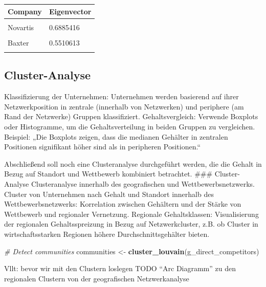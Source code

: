 \documentclass[
]{article}
\newenvironment{Shaded}{\begin{snugshade}}{\end{snugshade}}
\newcommand{\CommentTok}[1]{\textcolor[rgb]{0.56,0.35,0.01}{\textit{#1}}}
\newcommand{\FunctionTok}[1]{\textcolor[rgb]{0.13,0.29,0.53}{\textbf{#1}}}
\newcommand{\NormalTok}[1]{#1}
\newcommand{\OtherTok}[1]{\textcolor[rgb]{0.56,0.35,0.01}{#1}}
\begin{document}
\begin{tabular}{ll}
\toprule
Company & Eigenvector\\
\midrule
\cellcolor{gray!10}{Takeda Pharmaceuticals} & \cellcolor{gray!10}{1.0000000}\\
Novartis & 0.6885416\\
\cellcolor{gray!10}{Pfizer} & \cellcolor{gray!10}{0.5750772}\\
Baxter & 0.5510613\\
\cellcolor{gray!10}{AstraZeneca} & \cellcolor{gray!10}{0.3694600}\\
\bottomrule
\end{tabular}

\subsection{Cluster-Analyse}\label{cluster-analyse}

Klassifizierung der Unternehmen: Unternehmen werden basierend auf ihrer
Netzwerkposition in zentrale (innerhalb von Netzwerken) und periphere
(am Rand der Netzwerke) Gruppen klassifiziert. Gehaltsvergleich:
Verwende Boxplots oder Histogramme, um die Gehaltsverteilung in beiden
Gruppen zu vergleichen. Beispiel: „Die Boxplots zeigen, dass die
medianen Gehälter in zentralen Positionen signifikant höher sind als in
peripheren Positionen.``

Abschließend soll noch eine Clusteranalyse durchgeführt werden, die die
Gehalt in Bezug auf Standort und Wettbewerb kombiniert betrachtet.
\#\#\# Cluster-Analyse Clusteranalyse innerhalb des geografischen und
Wettbewerbsnetzwerks. Cluster von Unternehmen nach Gehalt und Standort
innerhalb des Wettbewerbsnetzwerks: Korrelation zwischen Gehältern und
der Stärke von Wettbewerb und regionaler Vernetzung. Regionale
Gehaltsklassen: Visualisierung der regionalen Gehaltsspreizung in Bezug
auf Netzwerkcluster, z.B. ob Cluster in wirtschaftsstarken Regionen
höhere Durchschnittsgehälter bieten.

\begin{Shaded}
\begin{Highlighting}[]
\CommentTok{\# Detect communities}
\NormalTok{communities }\OtherTok{\textless{}{-}} \FunctionTok{cluster\_louvain}\NormalTok{(g\_direct\_competitors)}
\end{Highlighting}
\end{Shaded}

Vllt: bevor wir mit den Clustern loslegen TODO ``Arc Diagramm'' zu den
regionalen Clustern von der geografischen Netzwerkanalyse
\end{document}
